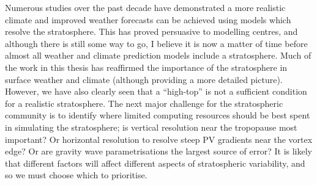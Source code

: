 Numerous studies over the past decade have demonstrated a more realistic climate
and improved weather forecasts can be achieved using models which resolve the
stratosphere. This has proved persuasive to modelling centres, and although
there is still some way to go, I believe it is now a matter of time before
almost all weather and climate prediction models include a stratosphere. Much of
the work in this thesis has reaffirmed the importance of the stratosphere in
surface weather and climate (although providing a more detailed
picture). However, we have also clearly seen that a ``high-top'' is not a
sufficient condition for a realistic stratosphere. The next major challenge for
the stratospheric community is to identify where limited computing resources
should be best spent in simulating the stratosphere; is vertical resolution near
the tropopause most important? Or horizontal resolution to resolve steep PV
gradients near the vortex edge? Or are gravity wave parametrisations the largest
source of error? It is likely that different factors will affect different
aspects of stratospheric variability, and so we must choose which to
prioritise. 



